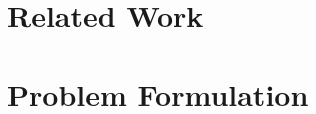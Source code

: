 \documentclass[conference]{IEEEtran}
\begin{document}
\section{Related Work}

\section{Problem Formulation}
\end{document}
